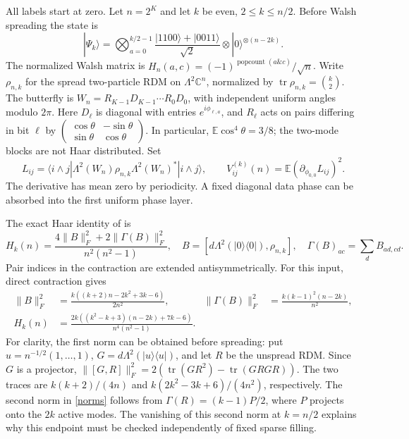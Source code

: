 \documentclass[11pt]{article}
\newcommand{\E}{\mathbb E}
\begin{document}
All labels start at zero. Let $n=2^K$ and let $k$ be even, $2\leq k\leq n/2$.
Before Walsh spreading the state is
\[
 |\Psi_k\rangle=\bigotimes_{a=0}^{k/2-1}
 \frac{|1100\rangle+|0011\rangle}{\sqrt2}
 \otimes|0\rangle^{\otimes(n-2k)}.
\]
The normalized Walsh matrix is $H_n(a,c)=(-1)^{\operatorname{popcount}(a\mathbin{\&}c)}/\sqrt n$.
Write $\rho_{n,k}$ for the spread two-particle RDM on $\Lambda^2\mathbb C^n$,
normalized by $\operatorname{tr}\rho_{n,k}=\binom k2$.
The butterfly is $W_n=R_{K-1}D_{K-1}\cdots R_0D_0$, with independent
uniform angles modulo $2\pi$. Here $D_\ell$ is diagonal with entries
$e^{i\phi_{\ell,a}}$, and $R_\ell$ acts on pairs differing in bit $\ell$ by
$\left(\begin{smallmatrix}\cos\theta&-\sin\theta\\\sin\theta&\cos\theta\end{smallmatrix}\right)$.
In particular, $\E\cos^4\theta=3/8$; the two-mode blocks are not Haar distributed.
Set
\[
 L_{ij}=\langle i\wedge j|\Lambda^2(W_n)\rho_{n,k}\Lambda^2(W_n)^*|i\wedge j\rangle,
 \qquad V^{(k)}_{ij}(n)=\E(\partial_{\phi_{0,0}}L_{ij})^2.
\]
The derivative has mean zero by periodicity. A fixed diagonal data phase can be
absorbed into the first uniform phase layer.

The exact Haar identity of \cite[Theorem 9 and Appendix A.2]{K} is
\[
 H_k(n)=\frac{4\|B\|_F^2+2\|\Gamma(B)\|_F^2}{n^2(n^2-1)},\quad
 B=[d\Lambda^2(|0\rangle\langle0|),\rho_{n,k}],\quad
 \Gamma(B)_{ac}=\sum_d B_{ad,cd}.
\]
Pair indices in the contraction are extended antisymmetrically. For this input,
direct contraction gives
\begin{align}
 \|B\|_F^2&=\frac{k((k+2)n-2k^2+3k-6)}{2n^2},&
 \|\Gamma(B)\|_F^2&=\frac{k(k-1)^2(n-2k)}{n^2},\label{norms}\\
 H_k(n)&=\frac{2k((k^2-k+3)(n-2k)+7k-6)}{n^4(n^2-1)}.\label{haar}
\end{align}
For clarity, the first norm can be obtained before spreading: put
$u=n^{-1/2}(1,\ldots,1)$, $G=d\Lambda^2(|u\rangle\langle u|)$, and let $R$ be
the unspread RDM. Since $G$ is a projector,
$\|[G,R]\|_F^2=2(\operatorname{tr}(GR^2)-\operatorname{tr}(GRGR))$.
The two traces are $k(k+2)/(4n)$ and $k(2k^2-3k+6)/(4n^2)$, respectively.
The second norm in \eqref{norms} follows from
$\Gamma(R)=(k-1)P/2$, where $P$ projects onto the $2k$ active modes.
The vanishing of this second norm at $k=n/2$ explains why this endpoint must be
checked independently of fixed sparse filling.
\end{document}
